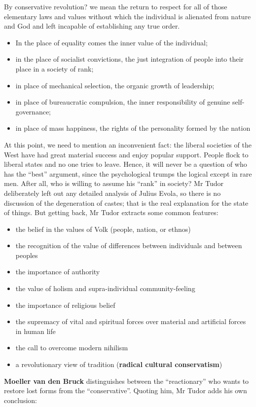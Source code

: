 \begin{quotex}
By conservative revolution? we mean the return to respect for all of those elementary laws and values without which the
individual is alienated from nature and God and left incapable of establishing any true order.

\begin{itemize}
\item
In the place of equality comes the inner value of the individual; 
\item
in the place of socialist convictions, the just integration of people into their place in a society of rank; 
\item
in place of mechanical selection, the organic growth of leadership; 
\item
in place of bureaucratic compulsion, the inner responsibility of genuine self-governance; 
\item
in place of mass happiness, the rights of the personality formed by the nation 
\end{itemize}
\end{quotex}

At this point, we need to mention an inconvenient fact: the liberal societies of the West have had great material
success and enjoy popular support. People flock to liberal states and no one tries to leave. Hence, it will never be a
question of who has the “best” argument, since the psychological trumps the logical except in rare men. After all, who
is willing to assume his “rank” in society? Mr Tudor deliberately left out any detailed analysis of Julius Evola, so
there is no discussion of the degeneration of castes; that is the real explanation for the state of things. But getting
back, Mr Tudor extracts some common features:

\begin{itemize}
\item the belief in the values of Volk (people, nation, or ethnos) 
\item the recognition of the value of differences between individuals and between peoples 
\item the importance of authority 
\item the value of holism and supra-individual community-feeling 
\item the importance of religious belief 
\item the supremacy of vital and spiritual forces over material and artificial forces in human life 
\item the call to overcome modern nihilism 
\item a revolutionary view of tradition (\textbf{radical cultural conservatism}) 
\end{itemize}
\textbf{Moeller van den Bruck} distinguishes between the “reactionary” who wants to restore lost forms from the
“conservative”. Quoting him, Mr Tudor adds his own conclusion:

